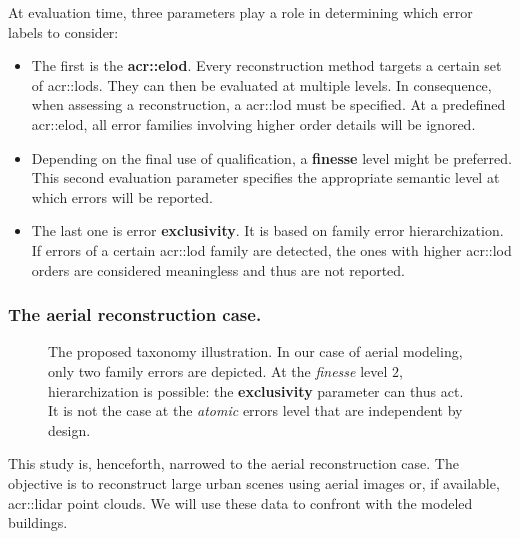 \documentclass[runningheads]{llncs}
\begin{document}
At evaluation time, three parameters play a role in determining which error labels to consider:
\begin{itemize}
    \item The first is the \textbf{\acrfull{acr::elod}}. Every reconstruction method targets a certain set of \glspl{acr::lod}. They can then be evaluated at multiple levels. In consequence, when assessing a reconstruction, a \acrshort{acr::lod} must be specified. At a predefined \acrshort{acr::elod}, all error families involving higher order details will be ignored.
    \item Depending on the final use of qualification, a \textbf{finesse} level might be preferred. This second evaluation parameter specifies the appropriate semantic level at which errors will be reported.
    \item The last one is error \textbf{exclusivity}. It is based on family error hierarchization. If errors of a certain \acrshort{acr::lod} family are detected, the ones with higher \acrshort{acr::lod} orders are considered meaningless and thus are not reported.
\end{itemize}

\subsubsection{The aerial reconstruction case.}
  \begin{figure}
        \begin{center}
            
            \caption{\label{fig::taxonomy} The proposed taxonomy illustration. In our case of aerial modeling, only two family errors are depicted. At the \textit{finesse} level $2$, hierarchization is possible: the \textbf{exclusivity} parameter can thus act. It is not the case at the \textit{atomic} errors level that are independent by design. }
        \end{center}
    \end{figure}
This study is, henceforth, narrowed to the aerial reconstruction case. The objective is to reconstruct large urban scenes using aerial images or, if available, \acrshort{acr::lidar} point clouds. We will use these data  to confront with the modeled buildings.
\end{document}
